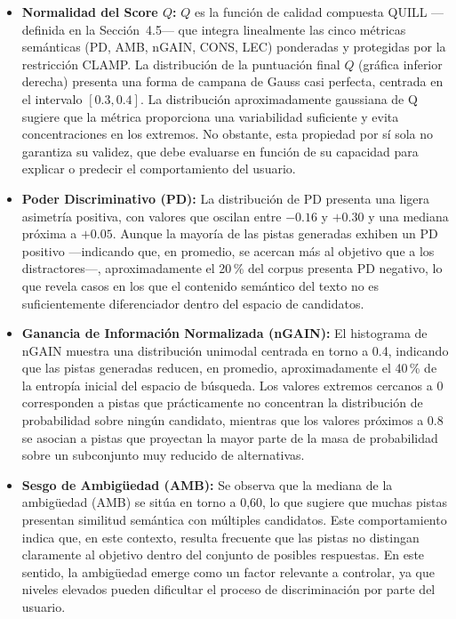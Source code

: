 \documentclass[../main.tex]{subfiles}
\begin{document}
\begin{itemize}
    \item \textbf{Normalidad del Score $Q$:} $Q$ es la función de calidad compuesta QUILL —definida en la Sección~4.5— que integra linealmente las cinco métricas semánticas (PD, AMB, nGAIN, CONS, LEC) ponderadas y protegidas por la restricción CLAMP. La distribución de la puntuación final $Q$ (gráfica inferior derecha) presenta una forma de campana de Gauss casi perfecta, centrada en el intervalo $[0.3, 0.4]$. La distribución aproximadamente gaussiana de Q sugiere que la métrica proporciona una variabilidad suficiente y evita concentraciones en los extremos. No obstante, esta propiedad por sí sola no garantiza su validez, que debe evaluarse en función de su capacidad para explicar o predecir el comportamiento del usuario.
    
    \item \textbf{Poder Discriminativo (PD):} La distribución de PD presenta una ligera asimetría positiva, con valores que oscilan entre $-0.16$ y $+0.30$ y una mediana próxima a $+0.05$. Aunque la mayoría de las pistas generadas exhiben un PD positivo —indicando que, en promedio, se acercan más al objetivo que a los distractores—, aproximadamente el 20\,\% del corpus presenta PD negativo, lo que revela casos en los que el contenido semántico del texto no es suficientemente diferenciador dentro del espacio de candidatos.

    \item \textbf{Ganancia de Información Normalizada (nGAIN):} El histograma de nGAIN muestra una distribución unimodal centrada en torno a 0.4, indicando que las pistas generadas reducen, en promedio, aproximadamente el 40\,\% de la entropía inicial del espacio de búsqueda. Los valores extremos cercanos a 0 corresponden a pistas que prácticamente no concentran la distribución de probabilidad sobre ningún candidato, mientras que los valores próximos a 0.8 se asocian a pistas que proyectan la mayor parte de la masa de probabilidad sobre un subconjunto muy reducido de alternativas.

    \item \textbf{Sesgo de Ambigüedad (AMB):} Se observa que la mediana de la ambigüedad (AMB) se sitúa en torno a 0,60, lo que sugiere que muchas pistas presentan similitud semántica con múltiples candidatos. Este comportamiento indica que, en este contexto, resulta frecuente que las pistas no distingan claramente al objetivo dentro del conjunto de posibles respuestas. En este sentido, la ambigüedad emerge como un factor relevante a controlar, ya que niveles elevados pueden dificultar el proceso de discriminación por parte del usuario.


\end{itemize}
\end{document}
